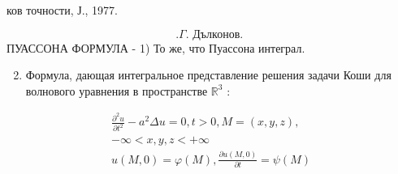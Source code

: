 \documentclass[10pt]{article}
\begin{document}
ков точности, Ј., 1977.



\[ . \Gamma \text {. Дълконов. } \] ПУАССОНА ФОРМУЛА - 1) То же, что Пуассона интеграл.



\begin{enumerate}

  \setcounter{enumi}{1}

  \item Формула, дающая интегральное представление решения задачи Коши для волнового уравнения в пространстве $\mathbb{R}^{3}$ :

\end{enumerate}



\[

\begin{gathered}

\frac{\partial^{2} u}{\partial t^{2}}-a^{2} \Delta u=0, t>0, M=(x, y, z), \\

-\infty<x, y, z<+\infty \\

u(M, 0)=\varphi(M), \frac{\partial u(M, 0)}{\partial t}=\psi(M)

\end{gathered}

\]
\end{document}
